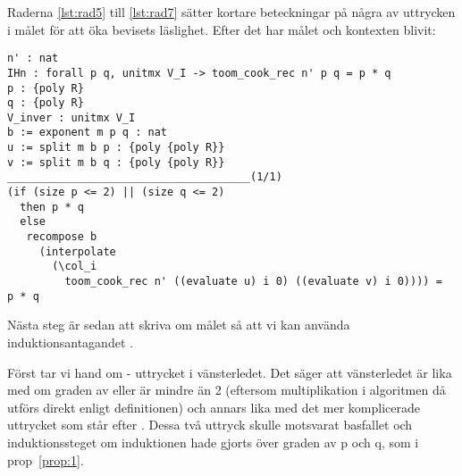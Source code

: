 Raderna \ref{lst:rad5} till \ref{lst:rad7} sätter kortare beteckningar på några
av uttrycken i målet för att öka bevisets läslighet. Efter det har målet och
kontexten blivit:
\begin{lstlisting}
n' : nat
IHn : forall p q, unitmx V_I -> toom_cook_rec n' p q = p * q
p : {poly R}
q : {poly R}
V_inver : unitmx V_I
b := exponent m p q : nat
u := split m b p : {poly {poly R}}
v := split m b q : {poly {poly R}}
______________________________________(1/1)
(if (size p <= 2) || (size q <= 2)
  then p * q
  else
   recompose b
     (interpolate
       (\col_i
         toom_cook_rec n' ((evaluate u) i 0) ((evaluate v) i 0)))) =
p * q
\end{lstlisting}
Nästa steg är sedan att skriva om målet så att vi kan använda
induktionsantagandet .

Först tar vi hand om  - uttrycket i vänsterledet.
Det säger att vänsterledet är lika med  om graden
av  eller  är mindre än 2 (eftersom multiplikation i algoritmen
då utförs direkt enligt definitionen) och annars
lika med det mer komplicerade uttrycket som står efter . Dessa två
uttryck skulle motsvarat basfallet och induktionssteget om induktionen hade
gjorts över graden av p och q, som i prop~\ref{prop:1}.

